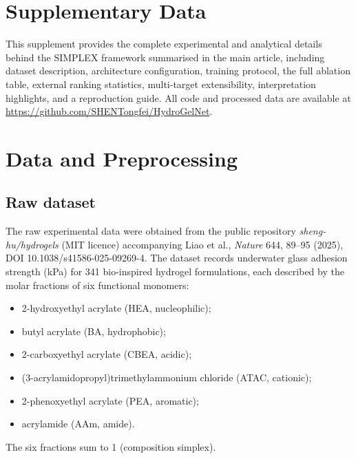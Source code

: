 \documentclass[utf8]{frontiers_suppmat}
\begin{document}
\onecolumn
{}

\title[Supplementary Material]{{}}

\maketitle

\section{Supplementary Data}

This supplement provides the complete experimental and analytical details
behind the SIMPLEX framework summarised in the main article, including
dataset description, architecture configuration, training protocol, the full
ablation table, external ranking statistics, multi-target extensibility,
interpretation highlights, and a reproduction guide. All code and processed
data are available at \url{https://github.com/SHENTongfei/HydroGelNet}.

\section{Data and Preprocessing}

\subsection{Raw dataset}
The raw experimental data were obtained from the public repository
\emph{sheng-hu/hydrogels} (MIT licence) accompanying Liao et al.,
\textit{Nature} 644, 89--95 (2025), DOI 10.1038/s41586-025-09269-4. The
dataset records underwater glass adhesion strength (kPa) for 341 bio-inspired
hydrogel formulations, each described by the molar fractions of six
functional monomers:
\begin{itemize}
\item 2-hydroxyethyl acrylate (HEA, nucleophilic);
\item butyl acrylate (BA, hydrophobic);
\item 2-carboxyethyl acrylate (CBEA, acidic);
\item (3-acrylamidopropyl)trimethylammonium chloride (ATAC, cationic);
\item 2-phenoxyethyl acrylate (PEA, aromatic);
\item acrylamide (AAm, amide).
\end{itemize}
The six fractions sum to 1 (composition simplex).
\end{document}
